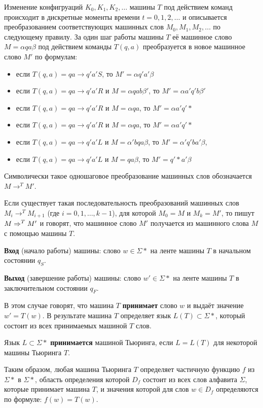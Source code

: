 Изменение конфигруаций $K_0, K_1, K_2, \dots$ машины $T$ под действием команд происходит в дискретные моменты времени $t = 0, 1, 2, \dots$ и описывается преобразованием соответствующих машинных слов $M_0, M_1, M_2, \dots$ по следующему правилу. За один шаг работы машины $T$ её машинное слово $M = \alpha q a \beta$ под действием команды $T(q ,a)$ преобразуется в новое машинное слово $M'$ по формулам:
\begin{itemize}
    \item если $T(q,a) = qa \to q'a'S$, то $M' = \alpha q' a' \beta$
    \item если $T(q, a) = qa \to q'a'R$ и $M = \alpha q a b \beta'$, то $M' = \alpha a'q'b\beta'$
    \item если $T(q,a) = qa \to q'a'R$ и $M=\alpha q a$, то $M' = \alpha a' q' *$
    \item если $T(q,a) = qa \to q'a'R$ и $M = \alpha q a$, то $M' = \alpha a' q' *$
    \item если $T(q, a) = qa \to q' a'L$ и $M=\alpha'bqa\beta$, то $M'=\alpha'q'ba'\beta$,
    \item если $T(q,a) =  qa \to q'a'L$ и $M = qa\beta$, то $M' = q'*a'\beta$
\end{itemize}

Символически такое одношаговое преобразование машинных слов обозначается $M \to^T M'$.

Если существует такая последовательность преобразований машинных слов $M_i \to^T M_{i+1}$ (где $i = 0,1,\dots,k-1$), для которой $M_0 = M$ и $M_k = M'$, то пишут $M \Rightarrow^T M'$ и говорят, что машинное слово $M'$ получается из машинного слова $M$ с помощью машины $T$.

\dftion \textbf{Вход} (начало работы) машины: слово $w \in \Sigma*$ на ленте машины $T$ в начальном состоянии $q_S$.

\dftion \textbf{Выход} (завершение работы) машины: слово $w' \in \Sigma*$ на ленте машины $T$ в заключительном состоянии $q_F$.

В этом случае говорят, что машина $T$ \textbf{принимает} слово $w$ и выдаёт значение $w'=T(w)$. В результате машина $T$ определяет язык $L(T)\subset\Sigma*$, который состоит из всех принимаемых машиной $T$ слов.

\dftion Язык $L \subset \Sigma*$ \textbf{принимается} машиной Тьюринга, если $L=L(T)$ для некоторой машины Тьюринга $T$.

Таким образом, любая машина Тьюринга $T$ определяет частичную функцию $f$ из $\Sigma*$ в $\Sigma*$, область определения которой $D_f$ состоит из всех слов алфавита $\Sigma$, которые принимает машина $T$, и значения которой для слов $w \in D_f$ определяются по формуле: $f(w) = T(w)$.

